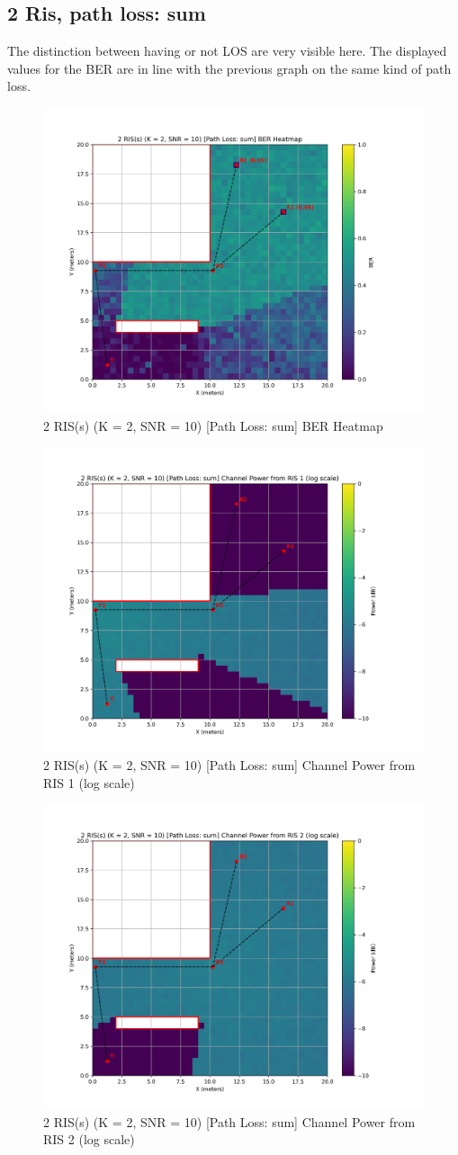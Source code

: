 \subsection*{2 Ris, path loss: sum}
The distinction between having or not LOS are very visible here. The displayed values for the BER are in line with the previous graph on the same kind of path loss.

\begin{figure}[H]
  \centering
  \includegraphics[width=0.45\linewidth]{imgs/heatmap-simulations/2 RIS(s) (K = 2, SNR = 10) [Path Loss_ sum] BER Heatmap.png}
  \caption{2 RIS(s) (K = 2, SNR = 10) [Path Loss: sum] BER Heatmap}
\end{figure}

\begin{figure}[H]
  \centering
  \includegraphics[width=0.45\linewidth]{imgs/heatmap-simulations/2 RIS(s) (K = 2, SNR = 10) [Path Loss_ sum] Channel Power from RIS 1 (log scale).png}
  \caption{2 RIS(s) (K = 2, SNR = 10) [Path Loss: sum] Channel Power from RIS 1 (log scale)}
\end{figure}

\begin{figure}[H]
  \centering
  \includegraphics[width=0.45\linewidth]{imgs/heatmap-simulations/2 RIS(s) (K = 2, SNR = 10) [Path Loss_ sum] Channel Power from RIS 2 (log scale).png}
  \caption{2 RIS(s) (K = 2, SNR = 10) [Path Loss: sum] Channel Power from RIS 2 (log scale)}
\end{figure}

